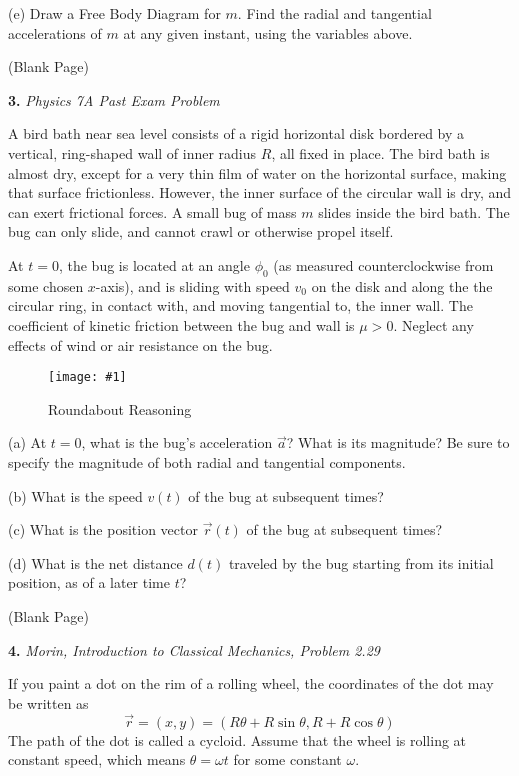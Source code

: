 \documentclass[11pt]{article}
\newcommand{\fig}[4]{
    \begin{figure}[H]
        \centering
        \texttt{[image: \#1]}
        \caption{#2}
        \label{exp4fit}
    \end{figure}
}
\theoremstyle{gangnamstyle}{\newtheorem{definition}{Definition}[]}
\theoremstyle{gangnamstyle}{\newtheorem{example}{Example}[]}
\theoremstyle{gangnamstyle}{\newtheorem{problem}{Problem}[]}
\begin{document}
(e) Draw a Free Body Diagram for $m$. Find the radial and tangential accelerations of $m$ at any given instant, using the variables above. 

\pagebreak

\begin{center}
(Blank Page)
\end{center}

\pagebreak

\textbf{3.} \textit{Physics 7A Past Exam Problem}

A bird bath near sea level consists of a rigid horizontal disk bordered by a vertical, ring-shaped wall of inner radius $R$, all fixed in place. The bird bath is almost dry, except for a very thin film of water on the horizontal surface, making that surface frictionless. However, the inner surface of the circular wall is dry, and can exert frictional forces. A small bug of mass $m$ slides inside the bird bath. The bug can only slide, and cannot crawl or otherwise propel itself. 

At $t = 0$, the bug is located at an angle $\phi_0$ (as measured counterclockwise from some chosen $x$-axis), and is sliding with speed $v_0$ on the disk and along the the circular ring, in contact with, and moving tangential to, the inner wall. The coefficient of kinetic friction between the bug and wall is $\mu > 0$. Neglect any effects of wind or air resistance on the bug.

\fig{figs/mt1/charman.png}{Roundabout Reasoning}{0.85}{0}

(a) At $t = 0$, what is the bug’s acceleration $\Vec{a}$? What is its magnitude? Be sure to specify the magnitude of both radial and tangential components. 

(b) What is the speed $v(t)$ of the bug at subsequent times? 

(c) What is the position vector $\Vec{r}(t)$ of the bug at subsequent times? 

(d) What is the net distance $d(t)$ traveled by the bug starting from its initial position, as of a later time $t$? 

\pagebreak

\begin{center}
(Blank Page)
\end{center}

\pagebreak

\textbf{4.} \textit{Morin, Introduction to Classical Mechanics, Problem 2.29} 

If you paint a dot on the rim of a rolling wheel, the coordinates of the dot may be written as
\[ \Vec{r} = (x, y) = (R\theta + R\sin\theta, R + R\cos\theta) \]
The path of the dot is called a cycloid. Assume that the wheel is rolling at constant speed, which means $\theta = \omega t$ for some constant $\omega$. \\
\end{document}
